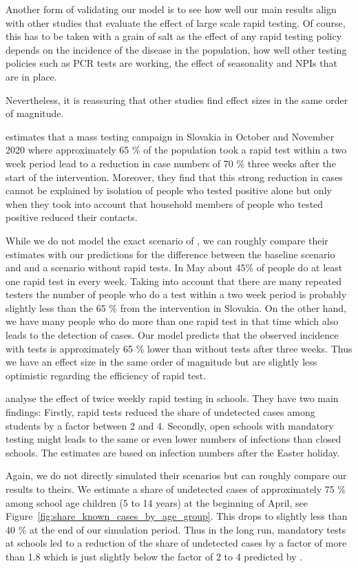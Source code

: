 Another form of validating our model is to see how well our main results align with
other studies that evaluate the effect of large scale rapid testing. Of course, this
has to be taken with a grain of salt as the effect of any rapid testing policy depends
on the incidence of the disease in the population, how well other testing policies
such as PCR tests are working, the effect of seasonality and NPIs that are in place.

Nevertheless, it is reassuring that other studies find effect sizes in the same order
of magnitude.

\citet{Pavelka2021} estimates that a mass testing campaign in Slovakia in October and
November 2020 where approximately 65 \% of the population took a rapid test within a two
week period lead to a reduction in case numbers of 70 \% three weeks after the start
of the intervention. Moreover, they find that this strong reduction in
cases cannot be explained by isolation of people who tested positive alone but only when
they took into account that household members of people who tested positive reduced
their contacts.

While we do not model the exact scenario of \citet{Pavelka2021}, we can roughly compare
their estimates with our predictions for the difference between the baseline scenario
and and a scenario without rapid tests. In May about 45\% of people do
at least one rapid test in every week. Taking into account that there are many repeated
testers the number of people who do a test within a two week period is probably
slightly less than the 65 \% from the intervention in Slovakia. On the other hand, we
have many people who do more than one rapid test in that time which also leads to the
detection of cases. Our model predicts that the observed incidence with tests is
approximately 65 \% lower than without tests after three weeks.
Thus we have an effect size in the same order of magnitude but are slightly
less optimistic regarding the efficiency of rapid test.

\citet{Berger2021} analyse the effect of twice weekly rapid testing in schools. They
have two main findings: Firstly, rapid tests reduced the share of undetected cases
among students by a factor between 2 and 4. Secondly, open schools with mandatory
testing might leads to the same or even lower numbers of infections than closed
schools. The estimates are based on infection numbers after the Easter holiday.

Again, we do not directly simulated their scenarios but can roughly compare our results
to theirs. We estimate a share of undetected cases of approximately 75 \% among school
age children (5 to 14 years) at the beginning of April, see
Figure~\ref{fig:share_known_cases_by_age_group}. This drops to slightly less than 40 \%
at the end of our simulation period. Thus in the long run, mandatory tests at schools
led to a reduction of the share of undetected cases by a factor of more than 1.8 which
is just slightly below the factor of 2 to 4 predicted by \citet{Berger2021}.

